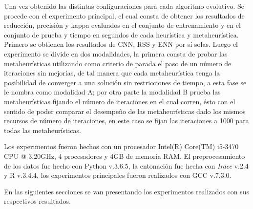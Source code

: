 Una vez obtenido las distintas configuraciones para cada algoritmo evolutivo. Se procede con el experimento principal, el cual consta de obtener los resultados de reducción, precisión y kappa evaluados en el conjunto de entrenamiento y en el conjunto de prueba y tiempo en segundos de cada heurística y metaheurística. Primero se obtienen los resultados de CNN, RSS y ENN por sí solas. Luego el experimento se divide en dos modalidades, la primera consta de probar las metaheurísticas utilizando como criterio de parada el paso de un número de iteraciones sin mejorías, de tal manera que cada metaheurística tenga la posibilidad de converger a una solución sin restricciones de tiempo, a esta fase se le nombra como modalidad A; por otra parte la modalidad B prueba las metaheurísticas fijando el número de iteraciones en el cual corren, ésto con el sentido de poder comparar el desempeño de las metaheurísticas dado los mismos recursos de número de iteraciones, en este caso se fijan las iteraciones a 1000 para todas las metaheurísticas.

Los experimentos fueron hechos con un procesador Intel(R) Core(TM) i5-3470 CPU @ 3.20GHz, 4 procesadores y 4GB de memoria RAM. El preprocesamiento de los datos fue hecho con Python v.3.6.5, la entonación fue hecha con \emph{Irace} v.2.4 y R v.3.4.4, los experimentos principales fueron realizados con GCC v.7.3.0.

En las siguientes secciones se van presentando los experimentos realizados con sus respectivos resultados.




